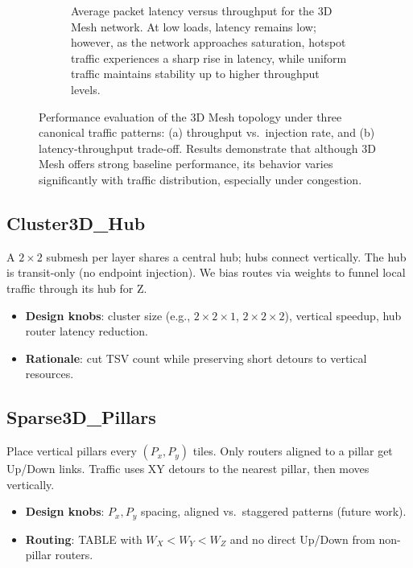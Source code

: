 \documentclass[11pt]{article}
\begin{document}
\begin{figure}[htbp]
\begin{subfigure}[t]{0.45\linewidth}
        \caption{Average packet latency versus throughput for the 3D Mesh network. At low loads, latency remains low; however, as the network approaches saturation, hotspot traffic experiences a sharp rise in latency, while uniform traffic maintains stability up to higher throughput levels.}
        \label{fig:mesh3d-latency-throughput}
    \end{subfigure}
    \caption{Performance evaluation of the 3D Mesh topology under three canonical traffic patterns: (a) throughput vs.\ injection rate, and (b) latency-throughput trade-off. Results demonstrate that although 3D Mesh offers strong baseline performance, its behavior varies significantly with traffic distribution, especially under congestion.}
    \label{fig:mesh3d-performance}
\end{figure}

\subsection{Cluster3D\_Hub}
A $2{\times}2$ submesh per layer shares a central hub; hubs connect vertically. The hub is transit-only (no endpoint injection). We bias routes via weights to funnel local traffic through its hub for Z.
\begin{itemize}[leftmargin=1em]
  \item \textbf{Design knobs}: cluster size (e.g., $2{\times}2{\times}1$, $2{\times}2{\times}2$), vertical speedup, hub router latency reduction.
  \item \textbf{Rationale}: cut TSV count while preserving short detours to vertical resources.
\end{itemize}

\subsection{Sparse3D\_Pillars}
Place vertical pillars every $(P_x, P_y)$ tiles. Only routers aligned to a pillar get Up/Down links. Traffic uses XY detours to the nearest pillar, then moves vertically.
\begin{itemize}[leftmargin=1em]
  \item \textbf{Design knobs}: $P_x,P_y$ spacing, aligned vs.\ staggered patterns (future work).
  \item \textbf{Routing}: TABLE with $W_X<W_Y<W_Z$ and no direct Up/Down from non-pillar routers.
\end{itemize}
\end{document}
